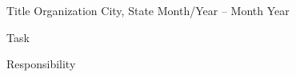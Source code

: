 

\begin{cventries}

\cventry
{Title} %
{Organization} %
{City, State} %
{Month/Year -- Month Year} %
{
  \begin{cvitems} %
    \item {Task}
    \item {Responsibility}
  \end{cvitems}
}
\vspace{2em}

\end{cventries}

